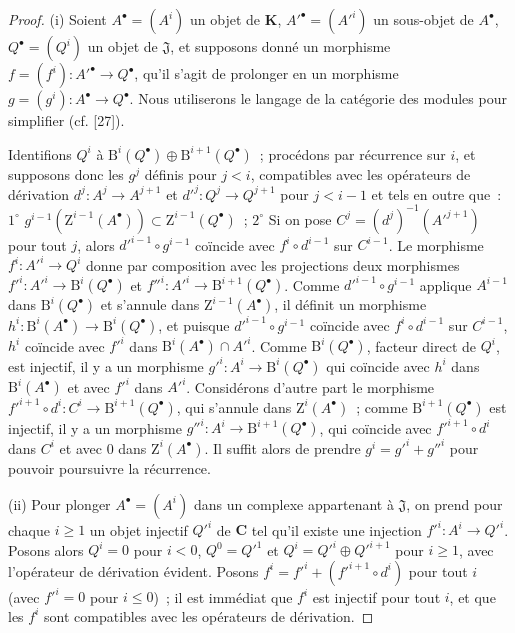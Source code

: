 \begin{proof}
\textup{(i)} Soient $A^\bullet=(A^i)$ un objet de $\boldsymbol{K}$,
$A'^\bullet=(A'^i)$ un sous-objet de $A^\bullet$,
$Q^\bullet=(Q^i)$ un objet de $\mathfrak J$, et supposons donné un morphisme
$f=(f^i):A'^\bullet\to Q^\bullet$, qu'il s'agit de prolonger en un morphisme
$g=(g^i):A^\bullet\to Q^\bullet$. Nous utiliserons le langage de la catégorie
des modules pour simplifier (cf. [27]).

Identifions $Q^i$ à
$\mathrm B^i(Q^\bullet)\oplus\mathrm B^{i+1}(Q^\bullet)$~; procédons par
récurrence sur $i$, et supposons donc les $g^j$ définis pour $j<i$,
compatibles avec les opérateurs de dérivation $d^j:A^j\to A^{j+1}$ et
$d'^j:Q^j\to Q^{j+1}$ pour $j<i-1$ et tels en outre que~: $1^\circ$ $g^{i-1}(\mathrm Z^{i-1}(A^\bullet))\subset
\mathrm Z^{i-1}(Q^\bullet)$~; $2^\circ$ Si on pose $C^j=(d^j)^{-1}(A'^{j+1})$ pour tout $j$, alors
$d'^{i-1}\circ g^{i-1}$ coïncide avec $f^i\circ d^{i-1}$ sur $C^{i-1}$.
Le morphisme $f^i:A'^i\to Q^i$ donne par composition avec les projections
deux morphismes
$f'^i:A'^i\to\mathrm B^i(Q^\bullet)$ et
$f''^i:A'^i\to\mathrm B^{i+1}(Q^\bullet)$. Comme
$d'^{i-1}\circ g^{i-1}$ applique $A^{i-1}$ dans
$\mathrm B^i(Q^\bullet)$ et s'annule dans $\mathrm Z^{i-1}(A^\bullet)$, il
définit un morphisme
$h^i:\mathrm B^i(A^\bullet)\to\mathrm B^i(Q^\bullet)$, et puisque
$d'^{i-1}\circ g^{i-1}$ coïncide avec $f^i\circ d^{i-1}$ sur $C^{i-1}$,
$h^i$ coïncide avec $f'^i$ dans
$\mathrm B^i(A^\bullet)\cap A'^i$. Comme $\mathrm B^i(Q^\bullet)$, facteur
direct de $Q^i$, est injectif, il y a un morphisme
$g'^i:A^i\to\mathrm B^i(Q^\bullet)$ qui coïncide avec $h^i$ dans
$\mathrm B^i(A^\bullet)$ et avec $f'^i$ dans $A'^i$. Considérons d'autre part
le morphisme
$f'^{i+1}\circ d^i:C^i\to\mathrm B^{i+1}(Q^\bullet)$, qui s'annule dans
$\mathrm Z^i(A^\bullet)$~; comme $\mathrm B^{i+1}(Q^\bullet)$ est injectif,
il y a un morphisme $g''^i:A^i\to\mathrm B^{i+1}(Q^\bullet)$, qui coïncide
avec $f'^{i+1}\circ d^i$ dans $C^i$ et avec $0$ dans
$\mathrm Z^i(A^\bullet)$. Il suffit alors de prendre $g^i=g'^i+g''^i$ pour
pouvoir poursuivre la récurrence.

\textup{(ii)} Pour plonger $A^\bullet=(A^i)$ dans un complexe appartenant à
$\mathfrak J$, on prend pour chaque $i\geq1$ un objet injectif $Q'^i$ de
$\boldsymbol{C}$ tel qu'il existe une injection $f'^i:A^i\to Q'^i$. Posons alors
$Q^i=0$ pour $i<0$, $Q^0=Q'^1$ et $Q^i=Q'^i\oplus Q'^{i+1}$ pour $i\geq1$,
avec l'opérateur de dérivation évident. Posons
$f^i=f'^i+(f'^{i+1}\circ d^i)$ pour tout $i$ (avec $f'^i=0$ pour $i\leq0$)~;
il est immédiat que $f^i$ est injectif pour tout $i$, et que les $f^i$ sont
compatibles avec les opérateurs de dérivation.
\end{proof}

